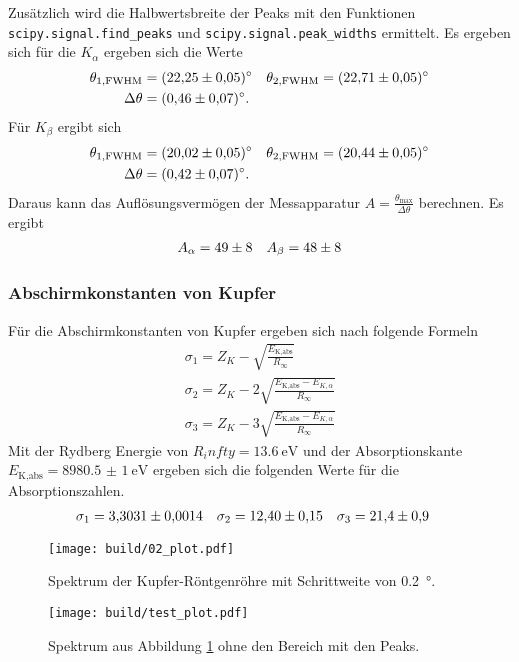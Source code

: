 Zusätzlich wird die Halbwertsbreite der Peaks mit den Funktionen \texttt{scipy.signal.find\_peaks}  und \texttt{scipy.signal.peak\_widths} \cite{scipy} ermittelt.
Es ergeben sich für die $K_\alpha$ ergeben sich die Werte
\begin{align*}
    \theta_{1,\text{FWHM}} &= \qty{22.25 \pm 0.05}{\degree} & \theta_{2,\text{FWHM}} = \qty{22.71 \pm 0.05}{\degree} \\
    \Delta \theta &= \qty{0.46 \pm 0.07}{\degree}.
\end{align*}
Für $K_\beta$ ergibt sich
\begin{align*}
    \theta_{1,\text{FWHM}} &= \qty{20.02 \pm 0.05}{\degree} & \theta_{2,\text{FWHM}} = \qty{20.44 \pm 0.05}{\degree} \\
    \Delta \theta &= \qty{0.42 \pm 0.07}{\degree}.
\end{align*}
Daraus kann das Auflösungsvermögen der Messapparatur $A= \frac{\theta_\text{max}}{\Delta \theta}$ berechnen.
Es ergibt
\begin{align*}
    A_\alpha &= \num{49 \pm 8} & A_\beta = \num{48 \pm 8}
\end{align*}

\subsubsection{Abschirmkonstanten von Kupfer}
Für die Abschirmkonstanten von Kupfer ergeben sich nach \cite{man:v602} folgende Formeln
\begin{align}
    \sigma_1 = Z_K -\sqrt{\frac{E_\text{K,abs}}{R_\infty}}\\
    \sigma_2 = Z_K -2\sqrt{\frac{E_\text{K,abs}- E_{K,\alpha} }{R_\infty}}\\
    \sigma_3 = Z_K -3\sqrt{\frac{E_\text{K,abs}- E_{K,\alpha} }{R_\infty}}
\end{align}
Mit der Rydberg Energie von $R_infty = \qty{13.6}{\eV}$ und der Absorptionskante $E_\text{K,abs} = \qty{8980.5(10)}{\eV}$ \cite{x-ray}
ergeben sich die folgenden Werte für die Absorptionszahlen.
\begin{align}
    \sigma_1 &= \num{3.3031 \pm 0.0014} &
    \sigma_2 &= \num{12.40 \pm 0.15} &
    \sigma_3 &= \num{21.4 \pm 0.9}
\end{align}



\begin{figure}
    \centering
    \texttt{[image: build/02\_plot.pdf]}
    \caption{Spektrum der Kupfer-Röntgenröhre mit Schrittweite von \qty{0.2}{\degree}.}
    \label{fig:02}
\end{figure}
\begin{figure}
    \centering
    \texttt{[image: build/test\_plot.pdf]}
    \caption{Spektrum aus Abbildung \ref{fig:02} ohne den Bereich mit den Peaks.}
    \label{fig:test}
\end{figure}

